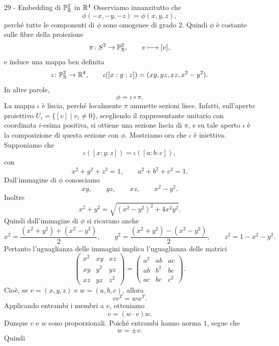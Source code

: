 \documentclass[a4paper]{article}
\begin{document}
\begin{snippetsolution}{29 - Embedding di \(\mathbb{P}^2_{\mathbb{R}}\)
    in \(\mathbb{R}^4\)}
    Osserviamo innanzitutto che
    \[
        \phi(-x,-y,-z)=\phi(x,y,z),
    \]
    perché tutte le componenti di \(\phi\) sono omogenee di grado \(2\). Quindi \(\phi\) è costante sulle fibre della proiezione
    \[
        \pi\colon S^2\to\mathbb{P}^2_{\mathbb{R}},
        \qquad
        v\longmapsto [v],
    \]
    e induce una mappa ben definita
    \[
        \iota\colon\mathbb{P}^2_{\mathbb{R}}\to\mathbb{R}^4,
        \qquad
        \iota([x:y:z])=(xy,yz,xz,x^2-y^2).
    \]
    In altre parole,
    \[
        \phi=\iota\circ\pi.
    \]
    La mappa \(\iota\) è liscia, perché localmente \(\pi\) ammette sezioni lisce. Infatti, sull'aperto proiettivo \(U_i=\{[v]\mid v_i\neq0\}\), scegliendo il rappresentante unitario con coordinata \(i\)-esima positiva, si ottiene una sezione liscia di \(\pi\), e su tale aperto \(\iota\) è la composizione di questa sezione con \(\phi\).
    Mostriamo ora che \(\iota\) è iniettiva. Supponiamo che
    \[
        \iota([x:y:z])=\iota([a:b:c]),
    \]
    con
    \[
        x^2+y^2+z^2=1,
        \qquad
        a^2+b^2+c^2=1.
    \]
    Dall'immagine di \(\phi\) conosciamo
    \[
        xy,\qquad yz,\qquad xz,\qquad x^2-y^2.
    \]
    Inoltre
    \[
        x^2+y^2=\sqrt{(x^2-y^2)^2+4x^2y^2}.
    \]
    Quindi dall'immagine di \(\phi\) si ricavano anche
    \[
        x^2=\frac{(x^2+y^2)+(x^2-y^2)}{2},
        \qquad
        y^2=\frac{(x^2+y^2)-(x^2-y^2)}{2},
        \qquad
        z^2=1-x^2-y^2.
    \]
    Pertanto l'uguaglianza delle immagini implica l'uguaglianza delle matrici
    \[
        \begin{pmatrix}
            x^2 & xy & xz\\
            xy & y^2 & yz\\
            xz & yz & z^2
        \end{pmatrix}
        =
        \begin{pmatrix}
            a^2 & ab & ac\\
            ab & b^2 & bc\\
            ac & bc & c^2
        \end{pmatrix}.
    \]
    Cioè, se \(v=(x,y,z)\) e \(w=(a,b,c)\), allora
    \[
        vv^T=ww^T.
    \]
    Applicando entrambi i membri a \(v\), otteniamo
    \[
        v=(w\cdot v)w.
    \]
    Dunque \(v\) e \(w\) sono proporzionali. Poiché entrambi hanno norma \(1\), segue che
    \[
        w=\pm v.
    \]
    Quindi
    \[
\]
\end{snippetsolution}
\end{document}
